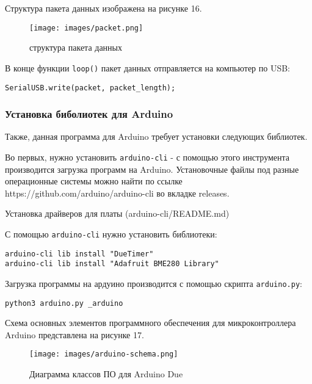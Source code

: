 \documentclass[../main.tex]{subfiles}
\begin{document}
Структура пакета данных изображена на рисунке 16.
\begin{figure}[H]
\centering
\texttt{[image: images/packet.png]}
\caption{структура пакета данных}
\end{figure}

В конце функции \verb|loop()| пакет данных отправляется на компьютер по USB:
\begin{lstlisting}
SerialUSB.write(packet, packet_length);
\end{lstlisting}

\subsubsection{Установка биболиотек для Arduino}

Также, данная программа для Arduino требует установки следующих библиотек. 

Во первых, нужно установить \texttt{arduino-cli} - с помощью этого инструмента производится загрузка программ на Arduino. Установочные файлы под разные операционные системы можно найти по ссылке https://github.com/arduino/arduino-cli во вкладке releases.

Установка драйверов для платы (arduino-cli/README.md)

С помощью \texttt{arduino-cli} нужно установить библиотеки:

\begin{lstlisting}
arduino-cli lib install "DueTimer"
arduino-cli lib install "Adafruit BME280 Library"
\end{lstlisting}


Загрузка программы на ардуино производится с помощью скрипта \texttt{arduino.py}:
\begin{lstlisting}
python3 arduino.py _arduino
\end{lstlisting}

Схема основных элементов программного обеспечения для микроконтроллера Arduino представлена на рисунке 17.

\begin{figure}[H]
\centering
\texttt{[image: images/arduino-schema.png]}
\caption{Диаграмма классов ПО для Arduino Due}
\end{figure}

\newpage
\end{document}
